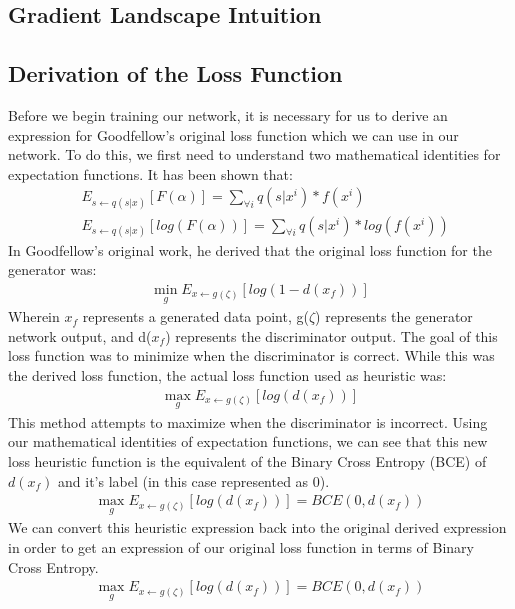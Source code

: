 \documentclass[conference]{IEEEtran}
\begin{document}
\subsection{Gradient Landscape Intuition}

\subsection{Derivation of the Loss Function}
Before we begin training our network, it is necessary for us to derive an expression for Goodfellow's original loss function which we can use in our network. To do this, we first need to understand two mathematical identities for expectation functions. It has been shown that: 
\begin{align*}
&E_{s \leftarrow q(s|x)}[F(\alpha)] = \sum_{\forall i} q(s|x^i) * f(x^i) \\
&E_{s \leftarrow q(s|x)}[log(F(\alpha))] = \sum_{\forall i} q(s|x^i) * log(f(x^i))
\end{align*} \cite{b4}
\indent In Goodfellow's original work, he derived that the original loss function for the generator was:
\begin{align*}
    \min_g E_{x \leftarrow g(\zeta)}[log(1-d(x_{f}))]
\end{align*}
Wherein $x_{f}$ represents a generated data point, g($\zeta$) represents the generator network output, and d($x_f$) represents the discriminator output. The goal of this loss function was to minimize when the discriminator is correct. While this was the derived loss function, the actual loss function used as heuristic was: 
\begin{align*}
    \max_g E_{x \leftarrow g(\zeta)}[log(d(x_{f}))]
\end{align*}
This method attempts to maximize when the discriminator is incorrect. Using our mathematical identities of expectation functions, we can see that this new loss heuristic function is the equivalent of the Binary Cross Entropy (BCE) of $d(x_f)$ and it's label (in this case represented as 0). 
\begin{align*}
    \max_g E_{x \leftarrow g(\zeta)}[log(d(x_{f}))] = BCE(0, d(x_f))
\end{align*}
\cite{b1} \newline
\indent We can convert this heuristic expression back into the original derived expression in order to get an expression of our original loss function in terms of Binary Cross Entropy.  
\begin{align*}
    \max_g E_{x \leftarrow g(\zeta)}[log(d(x_{f}))] = BCE(0, d(x_f)) \\
\end{align*}
\end{document}

